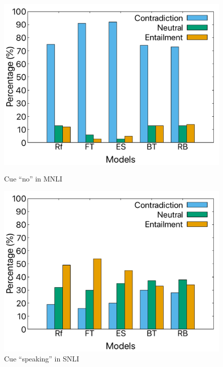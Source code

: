\begin{figure}[th]
\centering
\begin{minipage}[b]{0.45\linewidth}
\centering
\includegraphics[width=\columnwidth]{picture/no-mnli.pdf}
\caption*{Cue ``no'' in MNLI} 
\label{fig:cue_no} 
\end{minipage}
\hspace{0.5cm} 
\begin{minipage}[b]{0.45\linewidth} 
\centering 
\includegraphics[width=\columnwidth]{picture/speaking-snli.pdf} 
\caption*{Cue ``speaking'' in SNLI}
\label{fig:cue_speaking}
\end{minipage}

\vspace{0.5cm}


\end{figure}
